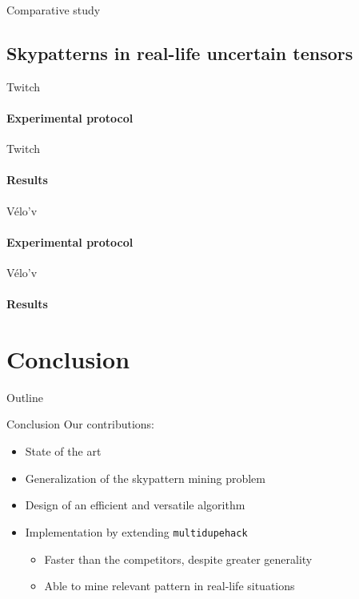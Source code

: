 \documentclass{beamer}
\newcommand{\mdh}{\texttt{multi\-dupe\-hack}}
\begin{document}
\begin{frame}{Comparative study}

\end{frame}


\subsection{Skypatterns in real-life uncertain tensors}

\begin{frame}{Twitch}
  \framesubtitle{Experimental protocol}

\end{frame}

\begin{frame}{Twitch}
  \framesubtitle{Results}

\end{frame}


\begin{frame}{Vélo'v}
  \framesubtitle{Experimental protocol}
  
\end{frame}

\begin{frame}{Vélo'v}
  \framesubtitle{Results}
  
\end{frame}


\section{Conclusion}
\begin{frame}{Outline}
  \tableofcontents[currentsection]
\end{frame}

\begin{frame}{Conclusion}
  Our contributions:
  \begin{itemize}
  \item State of the art
  \item Generalization of the skypattern mining problem
  \item Design of an efficient and versatile algorithm
  \item Implementation by extending \mdh{}
    \begin{itemize}
    \item Faster than the competitors, despite greater generality
    \item Able to mine relevant pattern in real-life situations
    \end{itemize}
  \end{itemize}
\end{frame}
\end{document}
